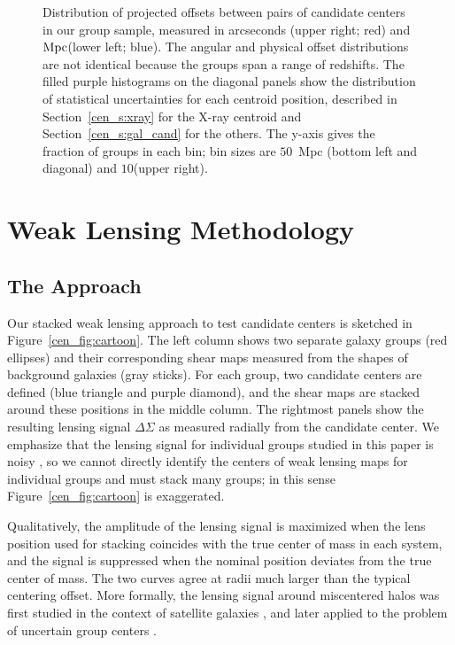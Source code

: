 \begin{figure*}[htb]
\caption{Distribution of projected offsets between pairs of candidate
  centers in our group sample, measured in arcseconds (upper right;
  red) and ${\rm Mpc} $(lower left; blue). The angular and physical
  offset distributions are not identical because the groups span a
  range of redshifts. The filled purple histograms on the diagonal
  panels show the distribution of statistical uncertainties for each
  centroid position, described in Section~\ref{cen_s:xray} for the X-ray
  centroid and Section~\ref{cen_s:gal_cand} for the others. The y-axis
  gives the fraction of groups in each bin; 
  bin sizes are $50$~\rm{Mpc} (bottom left and diagonal) and
  $10$\arcsec (upper right).}
\label{cen_fig:offsets}
\end{figure*}



\section{Weak Lensing Methodology}
\label{cen_s:lensing}

\subsection{The Approach}

Our stacked weak lensing approach to test candidate centers is
sketched in Figure~\ref{cen_fig:cartoon}. The left column shows two
separate galaxy groups (red ellipses) and their corresponding shear
maps measured from the shapes of background galaxies (gray
sticks). For each group, two candidate centers are defined (blue
triangle and purple diamond), and the shear maps are stacked around
these positions in the middle column. The rightmost panels show the
resulting lensing signal $\Delta\Sigma$ as measured radially from the
candidate center. We emphasize that the lensing signal for individual
groups studied in this paper is noisy \citep[signal-to-noise $\sim1$;
see Figure 1 of ][]{Leauthaud2010}, so we cannot directly identify the
centers of weak lensing maps for individual groups and must stack many
groups; in this sense Figure~\ref{cen_fig:cartoon} is exaggerated.

Qualitatively, the amplitude of the lensing signal is maximized when
the lens position used for stacking coincides with the true center of
mass in each system, and the signal is suppressed when the nominal
position deviates from the true center of mass. The two curves agree
at radii much larger than the typical centering offset.  More
formally, the lensing signal around miscentered halos was first
studied in the context of satellite galaxies \citep{Natarajan1997,
  Hudson1998, Guzik2002, Yang2003, Yang2006}, and later applied to the
problem of uncertain group centers \citep{Johnston2007a,
  Johnston2007b}.


